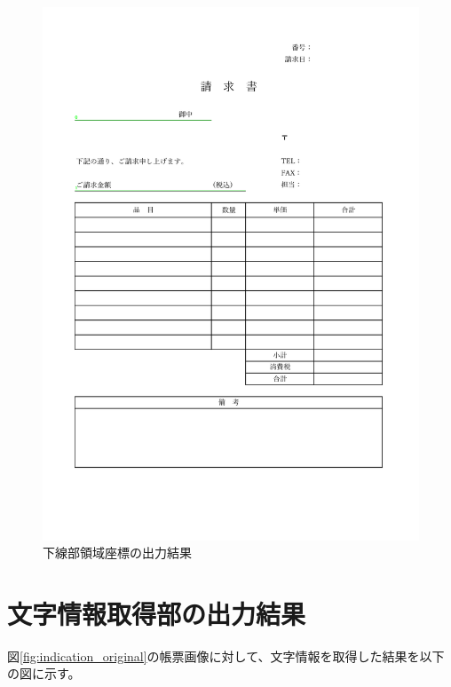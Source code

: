 \begin{figure}[t]
    \begin{center}
        \includegraphics[width=15cm]{image/05-indication/underlines.png}
        \caption{下線部領域座標の出力結果}
        \label{fig:underlines_with_label}
    \end{center}
\end{figure}



\section{文字情報取得部の出力結果}\label{sec:result_OCR}
図\ref{fig:indication_original}の帳票画像に対して、文字情報を取得した結果を以下の図に示す。

